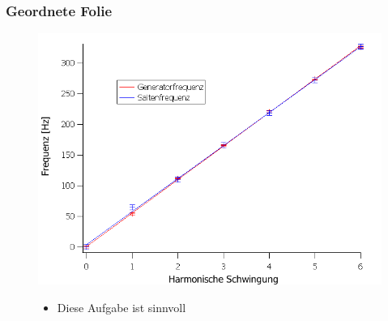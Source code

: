 \documentclass{beamer}
\begin{document}
\begin{frame}
\frametitle{Geordnete Folie}
  \begin{figure}
    \begin{minipage}{0.49\textwidth}
      \includegraphics[width=\textwidth]{Aufgabe1.png}
    \end{minipage}\pause
    \begin{minipage}{0.49\textwidth}
      \begin{itemize}
	\item Diese Aufgabe ist sinnvoll
      \end{itemize}
    \end{minipage}
  \end{figure}
\end{frame}
% 
\end{document}
